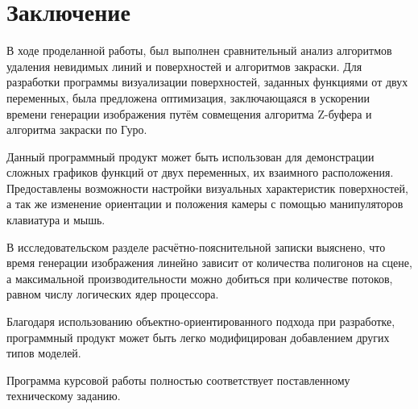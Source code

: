 \chapter*{Заключение}

В ходе проделанной работы, был выполнен сравнительный анализ алгоритмов удаления невидимых линий и поверхностей и алгоритмов закраски.
Для разработки программы визуализации поверхностей, заданных функциями от двух переменных, была предложена оптимизация, заключающаяся в ускорении времени генерации изображения путём совмещения алгоритма Z-буфера и алгоритма закраски по Гуро.

Данный программный продукт может быть использован для демонстрации сложных графиков функций от двух переменных, их взаимного расположения.
Предоставлены возможности настройки визуальных характеристик поверхностей, а так же изменение ориентации и положения камеры с помощью манипуляторов клавиатура и мышь.

В исследовательском разделе расчётно-пояснительной записки выяснено, что время генерации изображения линейно зависит от количества полигонов на сцене, а максимальной производительности можно добиться при количестве потоков, равном числу логических ядер процессора.

Благодаря использованию объектно-ориентированного подхода при разработке, программный продукт может быть легко модифицирован добавлением других типов моделей.

Программа курсовой работы полностью соответствует поставленному техническому заданию.
